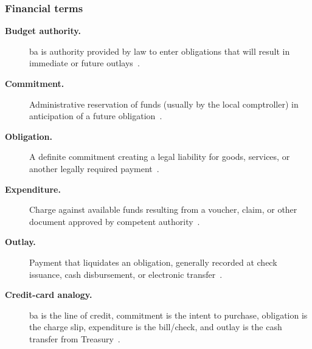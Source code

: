 \documentclass[../main.tex]{subfiles}
\begin{document}
\subsubsection{Financial terms}
\begin{description}
  \item[\textbf{Budget authority.}] \ac{ba} is authority provided by law to enter obligations that will result in immediate or future outlays~\autocite{GAO-Budget-Glossary-2005}.
  \item[\textbf{Commitment.}] Administrative reservation of funds (usually by the local comptroller) in anticipation of a future obligation~\autocite{edo-3-1-3-program-funding-2025}.
  \item[\textbf{Obligation.}] A definite commitment creating a legal liability for goods, services, or another legally required payment~\autocite{GAO-Budget-Glossary-2005}.
  \item[\textbf{Expenditure.}] Charge against available funds resulting from a voucher, claim, or other document approved by competent authority~\autocite{edo-3-1-3-program-funding-2025}.
  \item[\textbf{Outlay.}] Payment that liquidates an obligation, generally recorded at check issuance, cash disbursement, or electronic transfer~\autocite{GAO-Budget-Glossary-2005}.
\end{description}

\begin{description}
  \item[\textbf{Credit-card analogy.}] \ac{ba} is the line of credit, commitment is the intent to purchase, obligation is the charge slip, expenditure is the bill/check, and outlay is the cash transfer from Treasury~\autocite{edo-3-1-3-program-funding-2025}.
\end{description}
\end{document}
